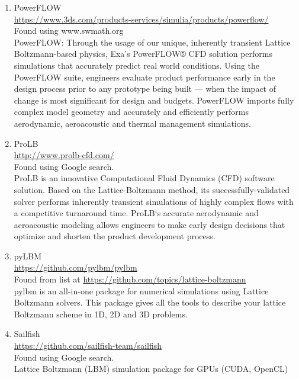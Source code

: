 \documentclass{article}
\begin{document}
\begin{enumerate}
\item PowerFLOW \\
\href{https://www.3ds.com/products-services/simulia/products/powerflow/}{https://www.3ds.com/products-services/simulia/products/powerflow/}\\
Found using www.swmath.org \\
PowerFLOW: Through the usage of our unique, inherently transient Lattice Boltzmann-based physics, Exa’s PowerFLOW® CFD solution performs simulations that accurately predict real world conditions. Using the PowerFLOW suite, engineers evaluate product performance early in the design process prior to any prototype being built — when the impact of change is most significant for design and budgets. PowerFLOW imports fully complex model geometry and accurately and efficiently performs aerodynamic, aeroacoustic and thermal management simulations.

\item ProLB \\
\href{http://www.prolb-cfd.com/}{http://www.prolb-cfd.com/}
\\
Found using Google search.\\
ProLB is an innovative Computational Fluid Dynamics (CFD) software solution. Based on the Lattice-Boltzmann method, its successfully-validated solver performs inherently transient simulations of highly complex flows with a competitive turnaround time. ProLB‘s accurate aerodynamic and aeroacoustic modeling allows engineers to make early design decisions that optimize and shorten the product development process.

\item pyLBM
\\
\href{https://github.com/pylbm/pylbm}{https://github.com/pylbm/pylbm}
\\
Found from list at \href{https://github.com/topics/lattice-boltzmann}{https://github.com/topics/lattice-boltzmann}\\
pylbm is an all-in-one package for numerical simulations using Lattice Boltzmann solvers.
This package gives all the tools to describe your lattice Boltzmann scheme in 1D, 2D and 3D problems.

\item Sailfish \\
\href{https://github.com/sailfish-team/sailfish}{https://github.com/sailfish-team/sailfish}
\\
Found using Google search.\\
Lattice Boltzmann (LBM) simulation package for GPUs (CUDA, OpenCL)


\end{enumerate}
\end{document}

